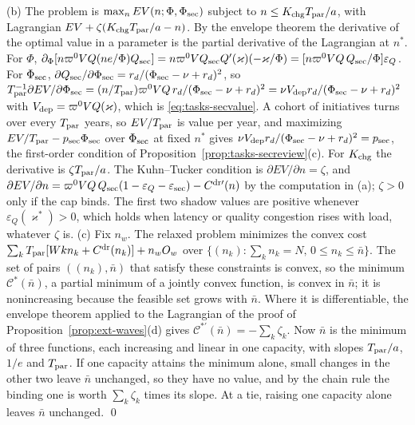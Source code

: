 (b) The problem is $\max_nEV(n;\Phi,\Phi_{\rm sec})$ subject to $n\le K_{\rm chg}T_{\rm par}/a$, with Lagrangian $EV+\zeta(K_{\rm chg}T_{\rm par}/a-n)$. By the envelope theorem the derivative of the optimal value in a parameter is the partial derivative of the Lagrangian at $n^*$. For $\Phi$, $\partial_\Phi[n\varpi^0VQ(ne/\Phi)Q_{\rm sec}]=n\varpi^0VQ_{\rm sec}Q'(\varkappa)(-\varkappa/\Phi)=[n\varpi^0VQ\,Q_{\rm sec}/\Phi]\varepsilon_Q$. For $\Phi_{\rm sec}$, $\partial Q_{\rm sec}/\partial\Phi_{\rm sec}=r_d/(\Phi_{\rm sec}-\nu+r_d)^2$, so $T_{\rm par}^{-1}\partial EV/\partial\Phi_{\rm sec}=(n/T_{\rm par})\varpi^0VQ\,r_d/(\Phi_{\rm sec}-\nu+r_d)^2=\nu V_{\rm dep}r_d/(\Phi_{\rm sec}-\nu+r_d)^2$ with $V_{\rm dep}=\varpi^0VQ(\varkappa)$, which is \eqref{eq:tasks-secvalue}. A cohort of initiatives turns over every $T_{\rm par}$ years, so $EV/T_{\rm par}$ is value per year, and maximizing $EV/T_{\rm par}-p_{\rm sec}\Phi_{\rm sec}$ over $\Phi_{\rm sec}$ at fixed $n^*$ gives $\nu V_{\rm dep}r_d/(\Phi_{\rm sec}-\nu+r_d)^2=p_{\rm sec}$, the first-order condition of Proposition~\ref{prop:tasks-secreview}(c). For $K_{\rm chg}$ the derivative is $\zeta T_{\rm par}/a$. The Kuhn--Tucker condition is $\partial EV/\partial n=\zeta$, and $\partial EV/\partial n=\varpi^0VQ\,Q_{\rm sec}(1-\varepsilon_Q-\varepsilon_{\rm sec})-C^{\rm dr\prime}(n)$ by the computation in (a); $\zeta>0$ only if the cap binds. The first two shadow values are positive whenever $\varepsilon_Q(\varkappa^*)>0$, which holds when latency or quality congestion rises with load, whatever $\zeta$ is.
(c) Fix $n_w$. The relaxed problem minimizes the convex cost $\sum_kT_{\rm par}[Wkn_k+C^{\rm dr}(n_k)]+n_wO_w$ over $\{(n_k):\sum_kn_k=N,\,0\le n_k\le\bar n\}$. The set of pairs $((n_k),\bar n)$ that satisfy these constraints is convex, so the minimum $\mathcal C^*(\bar n)$, a partial minimum of a jointly convex function, is convex in $\bar n$; it is nonincreasing because the feasible set grows with $\bar n$. Where it is differentiable, the envelope theorem applied to the Lagrangian of the proof of Proposition~\ref{prop:ext-waves}(d) gives $\mathcal C^{*\prime}(\bar n)=-\sum_k\zeta_k$. Now $\bar n$ is the minimum of three functions, each increasing and linear in one capacity, with slopes $T_{\rm par}/a$, $1/e$ and $T_{\rm par}$. If one capacity attains the minimum alone, small changes in the other two leave $\bar n$ unchanged, so they have no value, and by the chain rule the binding one is worth $\sum_k\zeta_k$ times its slope. At a tie, raising one capacity alone leaves $\bar n$ unchanged. \qed

